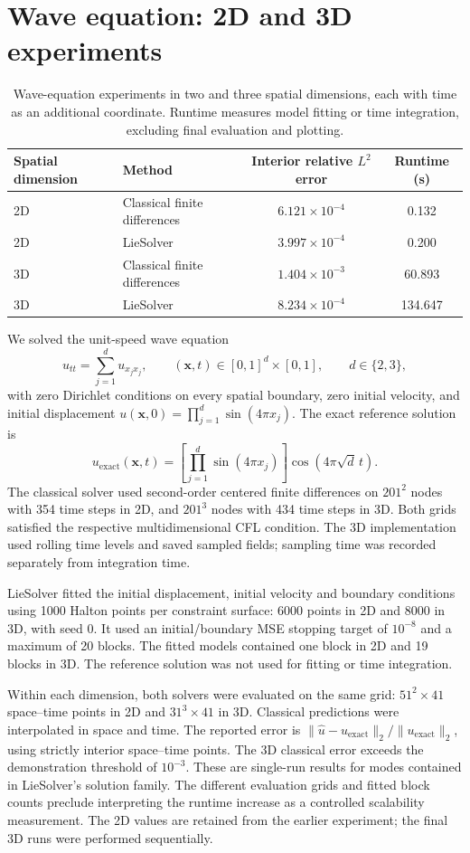 \documentclass{article}
\begin{document}
\section*{Wave equation: 2D and 3D experiments}
\begin{table}[htbp]
    \centering
    \begin{tabular}{llcc}
        \hline
        Spatial dimension & Method & Interior relative $L^2$ error & Runtime (s) \\
        \hline
        2D & Classical finite differences & $6.121 \times 10^{-4}$ & 0.132 \\
        2D & LieSolver & $3.997 \times 10^{-4}$ & 0.200 \\
        3D & Classical finite differences & $1.404 \times 10^{-3}$ & 60.893 \\
        3D & LieSolver & $8.234 \times 10^{-4}$ & 134.647 \\
        \hline
    \end{tabular}
    \caption{Wave-equation experiments in two and three spatial dimensions,
    each with time as an additional coordinate. Runtime measures model fitting
    or time integration, excluding final evaluation and plotting.}
    \label{tab:wave_2d_3d_comparison}
\end{table}

We solved the unit-speed wave equation
\[
    u_{tt}=\sum_{j=1}^{d}u_{x_jx_j},
    \qquad (\mathbf{x},t)\in[0,1]^d\times[0,1],
    \qquad d\in\{2,3\},
\]
with zero Dirichlet conditions on every spatial boundary, zero initial
velocity, and initial displacement
$u(\mathbf{x},0)=\prod_{j=1}^{d}\sin(4\pi x_j)$.
The exact reference solution is
\[
    u_{\mathrm{exact}}(\mathbf{x},t)
    =\left[\prod_{j=1}^{d}\sin(4\pi x_j)\right]
      \cos(4\pi\sqrt{d}\,t).
\]
The classical solver used second-order centered finite differences on
$201^2$ nodes with 354 time steps in 2D, and $201^3$ nodes with 434 time
steps in 3D. Both grids satisfied the respective multidimensional CFL
condition. The 3D implementation used rolling time levels and saved sampled
fields; sampling time was recorded separately from integration time.

LieSolver fitted the initial displacement, initial velocity and boundary
conditions using 1000 Halton points per constraint surface: 6000 points in
2D and 8000 in 3D, with seed 0. It used an initial/boundary MSE stopping
target of $10^{-8}$ and a maximum of 20 blocks. The fitted models contained
one block in 2D and 19 blocks in 3D. The reference solution was not used
for fitting or time integration.

Within each dimension, both solvers were evaluated on the same grid:
$51^2\times41$ space--time points in 2D and $31^3\times41$ in 3D.
Classical predictions were interpolated in space and time. The reported
error is $\|\hat{u}-u_{\mathrm{exact}}\|_2/\|u_{\mathrm{exact}}\|_2$,
using strictly interior space--time points. The 3D classical error exceeds
the demonstration threshold of $10^{-3}$. These are single-run results
for modes contained in LieSolver's solution family. The different evaluation
grids and fitted block counts preclude interpreting the runtime increase
as a controlled scalability measurement. The 2D values are retained from
the earlier experiment; the final 3D runs were performed sequentially.
\end{document}
